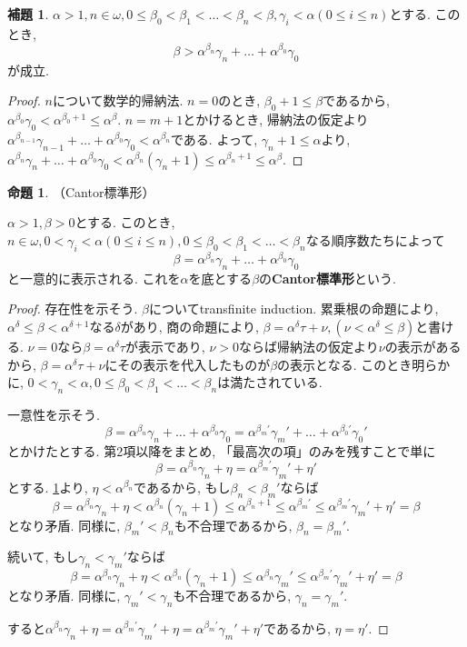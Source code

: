 \documentclass[a4paper, twoside]{bxjsarticle}
\theoremstyle{definition}
\newtheorem{prop}[thm]{命題}
\newtheorem{lem}[thm]{補題}
\begin{document}
        \begin{lem}\label{forcantor}
            $\alpha>1, n\in\omega, 0\leq\beta_0<\beta_1<\dots<\beta_n<\beta, \gamma_i<\alpha(0\leq i\leq n)$とする. このとき,\[\beta>\alpha^{\beta_n}\gamma_n+\dots+\alpha^{\beta_0}\gamma_0\]が成立.
        \end{lem}
        \begin{proof}
            $n$について数学的帰納法. $n=0$のとき, $\beta_0+1\leq\beta$であるから,  $\alpha^{\beta_0}\gamma_0<\alpha^{\beta_0+1}\leq\alpha^\beta$. $n=m+1$とかけるとき, 帰納法の仮定より$\alpha^{\beta_{n-1}}\gamma_{n-1}+\dots+\alpha^{\beta_0}\gamma_0<\alpha^{\beta_n}$である. よって, $\gamma_n+1\leq\alpha$より, $\alpha^{\beta_n}\gamma_n+\dots+\alpha^{\beta_0}\gamma_0<\alpha^{\beta_n}(\gamma_n+1)\leq\alpha^{\beta_n+1}\leq\alpha^\beta$.
        \end{proof}
        \begin{prop}
            （Cantor標準形）
            
            $\alpha>1, \beta>0$とする. このとき, $n\in\omega, 0<\gamma_i<\alpha(0\leq i\leq n), 0\leq\beta_0<\beta_1<\dots<\beta_n$なる順序数たちによって\[\beta=\alpha^{\beta_n}\gamma_n+\dots+\alpha^{\beta_0}\gamma_0\]と一意的に表示される. これを$\alpha$を底とする$\beta$の\textbf{Cantor標準形}という.
        \end{prop}
        \begin{proof}
            存在性を示そう. $\beta$についてtransfinite induction. 累乗根の命題により, $\alpha^\delta\leq\beta<\alpha^{\delta+1}$なる$\delta$があり, 商の命題により, $\beta=\alpha^\delta\tau+\nu, (\nu<\alpha^\delta\leq\beta)$と書ける. $\nu=0$なら$\beta=\alpha^\delta\tau$が表示であり, $\nu>0$ならば帰納法の仮定より$\nu$の表示があるから, $\beta=\alpha^\delta\tau+\nu$にその表示を代入したものが$\beta$の表示となる. このとき明らかに, $0<\gamma_n<\alpha, 0\leq\beta_0<\beta_1<\dots<\beta_n$は満たされている.
            
            一意性を示そう.  \[\beta=\alpha^{\beta_n}\gamma_n+\dots+\alpha^{\beta_0}\gamma_0=\alpha^{\beta_m'}\gamma_m'+\dots+\alpha^{\beta_0'}\gamma_0'\]とかけたとする. 第2項以降をまとめ, 「最高次の項」のみを残すことで単に\[\beta=\alpha^{\beta_n}\gamma_n+\eta=\alpha^{\beta_m'}\gamma_m'+\eta'\]とする. \ref{forcantor}より, $\eta<\alpha^{\beta_n}$であるから, もし$\beta_n<\beta_m'$ならば\[\beta=\alpha^{\beta_n}\gamma_n+\eta<\alpha^{\beta_n}(\gamma_n+1)\leq\alpha^{\beta_n+1}\leq\alpha^{\beta_m'}\leq\alpha^{\beta_m'}\gamma_m'+\eta'=\beta\]となり矛盾. 同様に, $\beta_m'<\beta_n$も不合理であるから, $\beta_n=\beta_m'$.
            
            続いて, もし$\gamma_n<\gamma_m'$ならば\[\beta=\alpha^{\beta_n}\gamma_n+\eta<\alpha^{\beta_n}(\gamma_n+1)\leq\alpha^{\beta_n}\gamma_m'\leq\alpha^{\beta_m'}\gamma_m'+\eta'=\beta\]となり矛盾. 同様に, $\gamma_m'<\gamma_n$も不合理であるから, $\gamma_n=\gamma_m'$.
            
            すると$\alpha^{\beta_n}\gamma_n+\eta=\alpha^{\beta_m'}\gamma_m'+\eta=\alpha^{\beta_m'}\gamma_m'+\eta'$であるから, $\eta=\eta'$.
            \end{proof}
            
\end{document}
